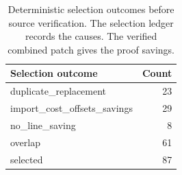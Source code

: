 \begin{table}[!htbp]\centering\small
\caption{Deterministic selection outcomes before source verification. The selection ledger records the causes. The verified combined patch gives the proof savings.}
\begin{tabular}{lr}\toprule
Selection outcome & Count\\\midrule
duplicate\_replacement & 23\\
import\_cost\_offsets\_savings & 29\\
no\_line\_saving & 8\\
overlap & 61\\
selected & 87\\
\bottomrule\end{tabular}\end{table}
